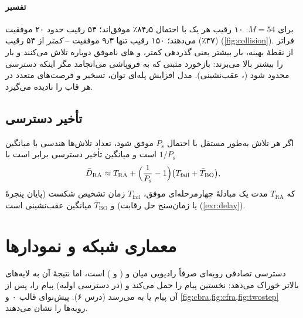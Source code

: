 \documentclass[11pt,a4paper]{article}
\begin{document}
\paragraph{تفسیر} برای $M = 54$: ۱۰ رقیب هر یک با احتمال ۸۴٫۵٪ موفق‌اند؛ ۵۴ رقیب حدود ۲۰ موفقیت (۳۷٪) می‌دهند؛
۱۵۰ رقیب تنها ۹٫۳ موفقیت -- \emph{کمتر} از ۵۴ رقیب (\cref{fig:collision}). فراتر از نقطهٔ بهینه، بار بیشتر یعنی
گذردهی کمتر، و های ناموفق دوباره تلاش می‌کنند و بار را بیشتر بالا می‌برند: بازخورد مثبتی که به فروپاشی
می‌انجامد مگر اینکه دسترسی محدود شود (، عقب‌نشینی). مدل افزایش پله‌ای توان، تسخیر و فرصت‌های متعدد
 در هر قاب را نادیده می‌گیرد.

\begin{acnfigure}
  \caption{تعداد مورد انتظار های موفق در هر فرصت  (محور چپ، \cref{eq:nsucc}) و احتمال موفقیت
  هر  (محور راست، \cref{eq:psucc}) برای $M = 54$ پیش‌نوای رقابتی.}
  \label{fig:collision}
\end{acnfigure}

\subsection{تأخیر دسترسی}
اگر هر تلاش به‌طور مستقل با احتمال $P_\mathrm{s}$ موفق شود، تعداد تلاش‌ها هندسی با میانگین $1/P_\mathrm{s}$ است و
میانگین تأخیر دسترسی برابر است با
\begin{equation}\label{eq:delay}
  \bar D_{\mathrm{RA}} \approx T_{\mathrm{RA}} + \Bigl(\frac{1}{P_\mathrm{s}}-1\Bigr)\bigl(T_{\mathrm{fail}} + \bar T_{\mathrm{BO}}\bigr),
\end{equation}
که $T_{\mathrm{RA}}$ مدت یک مبادلهٔ چهارمرحله‌ای موفق، $T_{\mathrm{fail}}$ زمان تشخیص شکست (پایان پنجرهٔ  یا
زمان‌سنج حل رقابت) و $\bar T_{\mathrm{BO}}$ میانگین عقب‌نشینی است (\cref{exr:delay}).

\section{معماری شبکه و نمودارها}
دسترسی تصادفی رویه‌ای صرفاً رادیویی میان  و  ( و ) است، اما نتیجهٔ آن به
لایه‌های بالاتر خوراک می‌دهد:  نخستین پیام  را حمل می‌کند و  (در دسترسی اولیه)
پیام  را، پس از آن پیام   یا  به
 می‌رسد (درس ۶).  پیش‌نوای قالب ۰ و \cref{fig:cbra,fig:cfra,fig:twostep} رویه‌ها را نشان می‌دهند.
\end{document}
